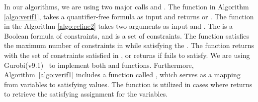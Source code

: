 
In our algorithms, we are using two major calls \checksat{} and \maxsat{}.
The function \checksat{} in Algorithm \ref{algo:verif1}, 
takes a quantifier-free formula as input and returns \sat{} or \unsat{}. 
The function \maxsat{} in the Algorithm \ref{algo:refine2} takes
two arguments as input \hardconstr{} and \softconstr{}. 
The \hardconstr{} is a Boolean formula of constraints,
and \softconstr{} is a set of constraints. 
The function \maxsat{} satisfies the maximum number of constraints
in \softconstr{} while satisfying the \hardconstr{}. 
The function \maxsat{} returns \sat{} with the set of
constraints satisfied in \softconstr{}, or returns
\unsat{} if \hardconstr{} fails to satisfy.
We are using Gurobi(v9.1)~\cite{gurobioptimizer} to implement 
both \checksat{} and \maxsat{} functions. 
{\color{red} Furthermore, Algorithm~\ref{algo:verif1} includes a function called \getmodel{}, 
which serves as a mapping from variables to satisfying values. 
The \getmodel{} function is utilized in cases where \checksat{} returns \sat{} to retrieve 
the satisfying assignment for the variables.}
 







